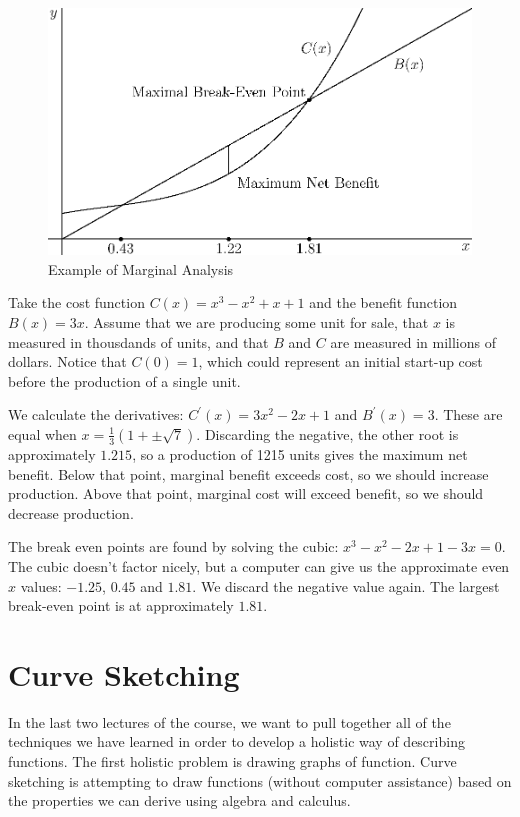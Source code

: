 \documentclass[fleqn]{report}
\begin{document}
\begin{figure}[t]
\centering
\includegraphics[width=12cm]{figure57.eps}
\caption{Example of Marginal Analysis}
\label{figure-marginal-analysis}
\end{figure}

\begin{example}
Take the cost function $C(x) = x^3 - x^2 + x+
1$ and the benefit function $B(x) = 3x$. Assume that we are
producing some unit for sale, that $x$ is measured in
thousdands of units, and that $B$ and $C$ are measured in
millions of dollars. Notice that $C(0) = 1$, which could
represent an initial start-up cost before the production of a
single unit.

We calculate the derivatives: $C^\prime(x) = 3x^2 -2x+1$ and
$B^\prime(x) = 3$. These are equal when $x = \frac{1}{3} (1
+\pm \sqrt{7})$. Discarding the negative, the other root is
approximately $1.215$, so a production of 1215 units gives the
maximum net benefit. Below that point, marginal benefit
exceeds cost, so we should increase production. Above that
point, marginal cost will exceed benefit, so we should
decrease production. 

The break even points are found by solving the cubic: $x^3
-x^2-2x+1 - 3x = 0$. The cubic doesn't factor nicely, but a
computer can give us the approximate even $x$ values: $-1.25$,
$0.45$ and $1.81$. We discard the negative value again. The
largest break-even point is at approximately $1.81$. 
\end{example}

\section{Curve Sketching}
\label{curve-sketching}

In the last two lectures of the course, we want to pull
together all of the techniques we have learned in order to
develop a holistic way of describing functions. The first
holistic problem is drawing graphs of function. Curve
sketching is attempting to draw functions (without computer
assistance) based on the properties we can derive using
algebra and calculus. 
\end{document}
